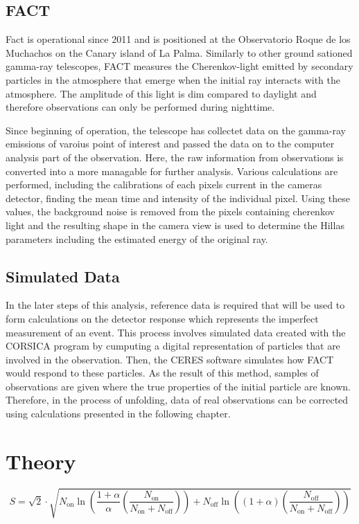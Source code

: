 \subsection{FACT}
Fact is operational since 2011 and is positioned at the Observatorio Roque de los Muchachos on the Canary island of La Palma.    
Similarly to other ground sationed gamma-ray telescopes, FACT measures the Cherenkov-light emitted by secondary particles in the atmosphere that emerge when the initial ray interacts with the atmosphere.
The amplitude of this light is dim compared to daylight and therefore observations can only be performed during nighttime.

Since beginning of operation, the telescope has collectet data on the gamma-ray emissions of varoius point of interest and passed the data on to the computer analysis part of the observation.
Here, the raw information from observations is converted into a more managable for further analysis.
Various calculations are performed, including the calibrations of each pixels current in the cameras detector, finding the mean time and intensity of the individual pixel.
Using these values, the background noise is removed from the pixels containing cherenkov light and the resulting shape in the camera view is used to determine the Hillas parameters including the estimated energy of the original ray.

\subsection{Simulated Data}
In the later steps of this analysis, reference data is required that will be used to form calculations on the detector response which represents the imperfect measurement of an event.
This process involves simulated data created with the CORSICA program\cite{corsica} by cumputing a digital representation of particles that are involved in the observation.
Then, the CERES software \cite{ceres} simulates how FACT would respond to these particles.
As the result of this method, samples of observations are given where the true properties of the initial particle are known.
Therefore, in the process of unfolding, data of real observations can be corrected using calculations presented in the following chapter. 
    \section{Theory}

    \begin{equation}
        S = \sqrt{2} \cdot \sqrt{N_\text{on} \ln\left( \frac{1 + \alpha}{\alpha} \left( \frac{N_\text{on}}{N_\text{on} + N_\text{off}} \right) \right) + N_\text{off} \ln\left( (1 + \alpha) \left( \frac{N_\text{off}}{N_\text{on} + N_\text{off}} \right) \right) }
        \label{eq:significance}
    \end{equation}

